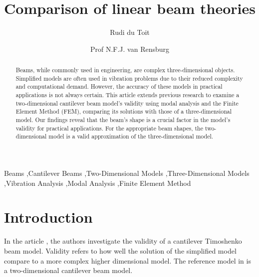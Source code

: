 



\begin{frontmatter}

\title{Comparison of linear beam theories}

\author{Rudi du Toit}
\author{Prof N.F.J. van Rensburg}
\address{Department of Mathematics, University of Pretoria, Pretoria, South Africa}


\begin{abstract}
Beams, while commonly used in engineering, are complex three-dimensional objects. Simplified models are often used in vibration problems due to their reduced complexity and computational demand. However, the accuracy of these models in practical applications is not always certain. This article extends previous research to examine a two-dimensional cantilever beam model's validity using modal analysis and the Finite Element Method (FEM), comparing its solutions with those of a three-dimensional model. Our findings reveal that the beam's shape is a crucial factor in the model's validity for practical applications. For the appropriate beam shapes, the two-dimensional model is a valid approximation of the three-dimensional model. 
\end{abstract}

\begin{keyword}
	Beams \sep Cantilever Beams \sep Two-Dimensional Models \sep Three-Dimensional Models \sep Vibration Analysis \sep Modal Analysis \sep Finite Element Method
\end{keyword}


\end{frontmatter}

\section{Introduction}
In the article \cite{LVV09}, the authors investigate the validity of a cantilever Timoshenko beam model. Validity refers to how well the solution of the simplified model compare to a more complex higher dimensional model. The reference model in \cite{LVV09} is a two-dimensional cantilever beam model.

